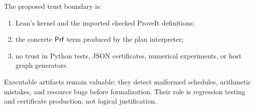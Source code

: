 The proposed trust boundary is:

\begin{enumerate}
\item Lean's kernel and the imported checked ProveIt definitions;
\item the concrete \(\mathsf{Prf}\) term produced by the plan interpreter;
\item no trust in Python tests, JSON certificates, numerical experiments, or host graph generators.
\end{enumerate}

Executable artifacts remain valuable: they detect malformed schedules, arithmetic mistakes, and
resource bugs before formalization.  Their role is regression testing and certificate production,
not logical justification.
